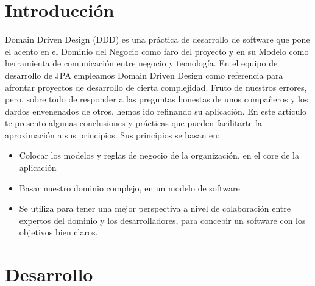 \documentclass{article}
\begin{document}
\section{Introducción}

Domain Driven Design (DDD) es una práctica de desarrollo de software que pone el acento en el Dominio del Negocio como faro del proyecto y en su Modelo como herramienta de comunicación entre negocio y tecnología. En el equipo de desarrollo de JPA empleamos Domain Driven Design  como referencia para afrontar proyectos de desarrollo de cierta complejidad. Fruto de nuestros errores, pero, sobre todo de responder a las preguntas honestas de unos compañeros y los dardos envenenados de otros, hemos ido refinando su aplicación. En este artículo te presento algunas conclusiones y prácticas que pueden facilitarte la aproximación a sus principios. Sus principios se basan en: 

\begin{itemize}
    \item Colocar los modelos y reglas de negocio de la organización, en el core de la aplicación 
    \item Basar nuestro dominio complejo, en un modelo de software. 
    
    \item Se utiliza para tener una mejor perspectiva a nivel de colaboración entre expertos del dominio y los desarrolladores, para concebir un software con los objetivos bien claros.
\end{itemize} 

\section{Desarrollo}
\end{document}

